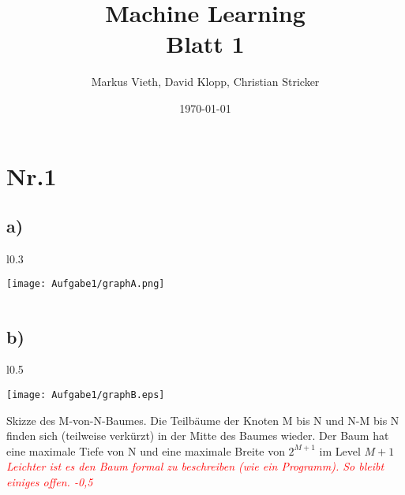 \documentclass[a4paper,11pt,twoside]{article}
\title{Machine Learning\\ Blatt 1}
\author{Markus Vieth, David Klopp, Christian Stricker}
\date{\today}
\begin{document}
\newcommand{\cor}[1]{\textcolor{red}{\textit{#1}}}
\maketitle
\cleardoublepage
\pagestyle{myheadings}

\section*{Nr.1}

\subsection*{a)}
\begin{wrapfigure}[18]{l}{0.3\linewidth}
	\begin{center}
		\vspace*{-3em}
		\texttt{[image: Aufgabe1/graphA.png]}
	\end{center}
\end{wrapfigure}
$~$\\
$~$\\
$~$\\
$~$\\
$~$\\
$~$\\
$~$\\
$~$\\
$~$\\
$~$\\
$~$\\
$~$\\
$~$\\
$~$\\
$~$\\
$~$\\
$~$\\
$~$\\
$~$\\
$~$\\
\subsection*{b)}
\begin{wrapfigure}[7]{l}{0.5\textwidth}
	\begin{center}
		
		\vspace*{-3em}
\texttt{[image: Aufgabe1/graphB.eps]}
\end{center}
\end{wrapfigure}
Skizze des M-von-N-Baumes. Die Teilbäume der Knoten M bis N und N-M bis N finden sich (teilweise verkürzt) in der Mitte des Baumes wieder. Der Baum hat eine maximale Tiefe von N und eine maximale Breite von $2^{M+1}$ im Level $M+1$ \cor{Leichter ist es den Baum formal zu beschreiben (wie ein Programm). So bleibt einiges offen. -0,5}
\newpage
\end{document}
